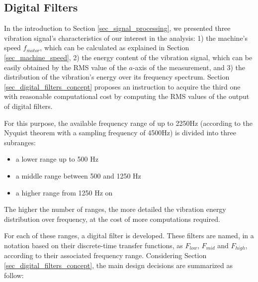 \documentclass[conference]{IEEEtran}
\begin{document}
\subsection{Digital Filters}

In the introduction to Section \ref{sec_signal_processing}, we presented three vibration signal's characteristics of our interest in the analysis: 1) the machine's speed $f_{motor}$, which can be calculated as explained in Section \ref{sec_machine_speed}, 2) the energy content of the vibration signal, which can be easily obtained by the RMS value of the $a$-axis of the measurement, and 3) the distribution of the vibration's energy over its frequency spectrum. Section \ref{sec_digital_filters_concept} proposes an instruction to acquire the third one with reasonable computational cost by computing the RMS values of the output of digital filters.

For this purpose, the available frequency range of up to 2250Hz (according to the Nyquist theorem with a sampling frequency of 4500Hz) is divided into three subranges:

\begin{itemize}
	\item a lower range up to 500 Hz
	\item a middle range between 500 and 1250 Hz
	\item a higher range from 1250 Hz on
\end{itemize}

The higher the number of ranges, the more detailed the vibration energy distribution over frequency, at the cost of more computations required.

For each of these ranges, a digital filter is developed. These filters are named, in a notation based on their discrete-time transfer functions, as $F_{low}$, $F_{mid}$ and $F_{high}$, according to their associated frequency range. Considering Section \ref{sec_digital_filters_concept}, the main design decisions are summarized as follow:
\end{document}
